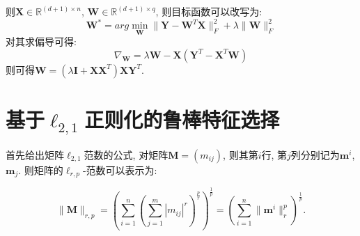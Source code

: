 \documentclass[lang=cn,10pt]{gorgeousnbook}
\numberwithin{equation}{section}%
\numberwithin{figure}{section}%
\begin{document}
则$\mathbf{X}\in \mathbb{R}^{(d+1)\times n}$, $\mathbf{W}\in \mathbb{R}^{(d+1)\times q}$, 则目标函数可以改写为:
 \begin{equation}
\mathbf{W}^*=arg\min_{\mathbf{W}}\lVert \mathbf{Y}-\mathbf{W}^T\mathbf{X}\rVert _{F}^{2}+\lambda \lVert \mathbf{W} \rVert _{F}^{2}
\end{equation}
对其求偏导可得:
 \begin{equation}
\nabla _{\mathbf{W}}=\lambda \mathbf{W}-\mathbf{X}\left( \mathbf{Y}^T-\mathbf{X}^T\mathbf{W} \right) 
\end{equation}
则可得$\mathbf{W}=\left( \lambda \mathbf{I}+\mathbf{XX}^T \right) \mathbf{XY}^T$.  

\section{基于$\ell_{2,1}$正则化的鲁棒特征选择}
首先给出矩阵$\ell_{2,1}$范数的公式, 对矩阵$\mathbf{M}=\left( m_{ij} \right) $, 则其第$i$行, 第$j$列分别记为$\mathbf{m}^i$, $\mathbf{m}_j$. 则矩阵的$\ell_{r,p}$-范数可以表示为:

 \begin{equation}
\lVert \mathbf{M} \rVert _{r,p}=\left( \sum_{i=1}^n{\left( \sum_{j=1}^m{\left| m_{ij} \right|^r} \right) ^{\frac{p}{r}}} \right) ^{\frac{1}{p}}=\left( \sum_{i=1}^n{\lVert \mathbf{m}^i \rVert _{r}^{p}} \right) ^{\frac{1}{p}}.
\end{equation}
\end{document}
